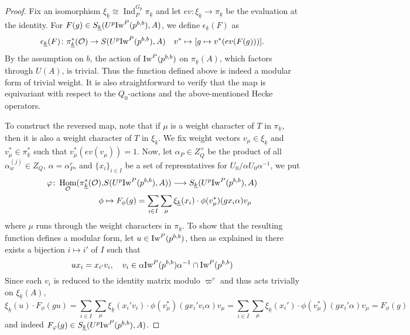 \documentclass[leqno]{amsart}
\newcommand{\wt}[1]{\underline{ #1 }}
\newcommand{\Iw}{\textnormal{Iw}}
\newcommand{\oo}{\mathcal{O}} %
\DeclareMathOperator{\Hom}{Hom}
\DeclareMathOperator{\Ind}{Ind}
\theoremstyle{definition}
\theoremstyle{remark}
\begin{document}
\begin{proof}
	Fix an isomorphism 
	$\xi_{\wt{k}}\cong \Ind_{P}^{G_p}\pi_{\wt{k}}$
	and let $ev\colon \xi_{\wt{k}}\to \pi_{\wt{k}}$
	be the evaluation at the identity.
	For $F(g)\in S_{\wt{k}}(U^p\Iw^P(p^{b,b}),A)$,
	we define 
	$\epsilon_{\wt{k}}(F)$ as 
	\begin{equation}\label{eq:wt_indep}
	\epsilon_{\wt{k}}(F)\colon 
	\pi^*_{\wt{k}}(\oo)\rightarrow
	S(U^p\Iw^P(p^{b,b}),A)\quad
	v^*\mapsto [g\mapsto v^*(ev(F(g)))].
	\end{equation}
	By the assumption on $b$,
	the action of $\Iw^P(p^{b,b})$ on $\pi_{\wt{k}}(A)$,
	which factors through $U(A)$,
	is trivial.
	Thus the function defined above is indeed 
	a modular form
	of trivial weight.
	It is also straightforward to verify
	that the map is equivariant with respect
	to the  $Q_0$-actions 
	and the above-mentioned Hecke operators.


	To construct the reversed map,
	note that if $\mu$ is a weight character of $T$ in  
	$\pi_{\wt{k}}$, then it is also a weight character 
	of $T$ in $\xi_{\wt{k}}$.
	We fix weight vectors $v_\mu\in \xi_{\wt{k}}$
	and $v^*_\mu\in \pi_{\wt{k}}^*$
	such that $v^*_{\mu}(ev(v_\mu))=1$.
	Now, let $\alpha_P\in Z_Q^+$ be the product
	of all $\alpha_w^{(j)}\in Z_Q$, $\alpha=\alpha_P^r$,
	and $\{x_i\}_{i\in I}$
	be a set of represntatives 
	for $U_0/\alpha U_0\alpha^{-1}$,
	we put 
	\begin{align*}
		\varphi\colon 
		\Hom_{\oo}(\pi_{\wt{k}}^*(\oo),&
		S(U^p\Iw^P(p^{b,b}),A))\longrightarrow
		S_{\wt{k}}(U^p\Iw^P(p^{b,b}),A)\\
		\phi&\mapsto 
		F_\phi(g)=\sum_{i\in I} \sum_{\mu}
		\xi_{\wt{k}}(x_i)\cdot 
		\phi(v^*_\mu)(gx_i\alpha)v_\mu
	\end{align*}
	where $\mu$ runs through the weight characters in 
	$\pi_{\wt{k}}$.
	To show that the resulting function 
	defines a modular form,
	let $u\in \Iw^P(p^{b,b})$, 
	then as explained in \cite[Prop 2.22]{ger}
	there exists a bijection $i\mapsto i'$ of $I$
	such that 
	 \[
		ux_i=x_{i'}v_i,\quad
		v_i\in\alpha\Iw^P(p^{b,b})\alpha^{-1} 
		\cap \Iw^P(p^{b,b})
	\]
	Since each $v_i$ is reduced to the identity matrix 
	modulo $\varpi^r$ and thus acts trivially on 
	$\xi_{\wt{k}}(A)$,
	\[
		\xi_{\wt{k}}(u)\cdot F_\phi(gu)=
		\sum_{i\in I}\sum_{\mu}
		\xi_{\wt{k}}(x_i'v_i)\cdot 
		\phi(v^*_\mu)(gx_i'v_i\alpha)v_\mu=
		\sum_{i\in I}\sum_{\mu}
		\xi_{\wt{k}}(x_i')\cdot 
		\phi(v^*_\mu)(gx_i'\alpha)v_\mu=F_\phi(g)
	\]
	and indeed $F_\varphi(g)\in 
	S_{\wt{k}}(U^p\Iw^P(p^{b,b}),A)$.


\end{proof}
\end{document}
